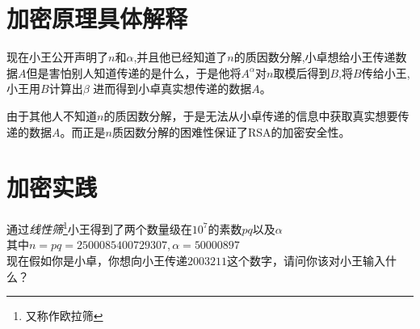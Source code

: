 \documentclass[UTF8]{ctexart}
\begin{document}
\section{加密原理具体解释}
现在小王公开声明了$n$和$\alpha$,并且他已经知道了$n$的质因数分解,小卓想给小王传递数据$A$但是害怕别人知道传递的是什么，于是他将$A^{\alpha}$对$n$取模后得到$B$,将$B$传给小王,
小王用$B$计算出$\beta$ 进而得到小卓真实想传递的数据$A$。

由于其他人不知道$n$的质因数分解，于是无法从小卓传递的信息中获取真实想要传递的数据$A$。而正是$n$质因数分解的困难性保证了RSA的加密安全性。
\section{加密实践}
通过\emph{线性筛}\footnote{又称作欧拉筛}小王得到了两个数量级在$10^{7}$的素数$pq$以及$\alpha $\\
其中$n=pq=2500085400729307$,\,$\alpha =50000897$\\
现在假如你是小卓，你想向小王传递$2003211$这个数字，请问你该对小王输入什么？
\end{document}
